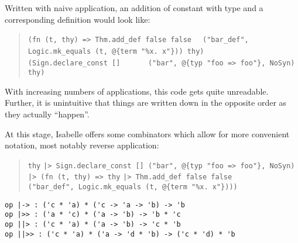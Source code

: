 \begin{isabellebody}
\begin{isamarkuptext}
  Written with naive application, an addition of constant
   with type  and
  a corresponding definition  would look like:

  \begin{quotation}
   \verb|(fn (t, thy) => Thm.add_def false false|\isasep\isanewline%
\verb|  ("bar_def", Logic.mk_equals (t, @{term "%x. x"})) thy)|\isasep\isanewline%
\verb|    (Sign.declare_const []|\isasep\isanewline%
\verb|      ("bar", @{typ "foo => foo"}, NoSyn) thy)|
  \end{quotation}

  With increasing numbers of applications, this code gets quite
  unreadable.  Further, it is unintuitive that things are
  written down in the opposite order as they actually ``happen''.%
\end{isamarkuptext}%
\isamarkuptrue%
%
\begin{isamarkuptext}%
\noindent At this stage, Isabelle offers some combinators which allow
  for more convenient notation, most notably reverse application:
  \begin{quotation}
\verb|thy|\isasep\isanewline%
\verb||\verb,|,\verb|> Sign.declare_const [] ("bar", @{typ "foo => foo"}, NoSyn)|\isasep\isanewline%
\verb||\verb,|,\verb|> (fn (t, thy) => thy|\isasep\isanewline%
\verb||\verb,|,\verb|> Thm.add_def false false|\isasep\isanewline%
\verb|     ("bar_def", Logic.mk_equals (t, @{term "%x. x"})))|
  \end{quotation}%
\end{isamarkuptext}%
\isamarkuptrue%
%
\isadelimmlref
%
\endisadelimmlref
%
\isatagmlref
%
\begin{isamarkuptext}%
\begin{mldecls}
  \verb|op |\verb,|,\verb|-> : ('c * 'a) * ('c -> 'a -> 'b) -> 'b| \\
  \verb|op |\verb,|,\verb|>> : ('a * 'c) * ('a -> 'b) -> 'b * 'c| \\
  \verb|op |\verb,|,\verb||\verb,|,\verb|> : ('c * 'a) * ('a -> 'b) -> 'c * 'b| \\
  \verb|op |\verb,|,\verb||\verb,|,\verb|>> : ('c * 'a) * ('a -> 'd * 'b) -> ('c * 'd) * 'b| \\
  \end{mldecls}%
\end{isamarkuptext}%
\isamarkuptrue%
%
\endisatagmlref
{\isafoldmlref}%
%
\isadelimmlref
%
\endisadelimmlref

\end{isabellebody}
